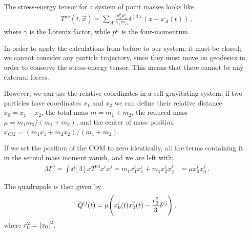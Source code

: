 \documentclass[main.tex]{subfiles}
\begin{document}
The stress-energy tensor for a system of point masses looks like 
%
\begin{align}
T^{\mu \nu }(t, \vec{x}) = \sum _{A} \frac{p^{\mu }_{A} p^{\nu }_{A}}{\gamma_{A}  m_{A}} \delta^{(3)} (x - x_{A}(t))
\,,
\end{align}
%
where \(\gamma \) is the Lorentz factor, while \(p^{\mu }\) is the four-momentum.  

In order to apply the calculations from before to our system, it must be closed; we cannot consider any particle trajectory, since they must move on geodesics in order to conserve the stress-energy tensor. This means that there cannot be any external forces. 

However, we can use the relative coordinates in a self-gravitating system: if two particles have coordinates \(x_1\) and \(x_2\) we can define their relative distance \(x_0 = x_1 - x_2 \), the total mass \(m = m_1 + m_2 \), the reduced mass \(\mu = m_1 m_2 / (m_1 + m_2 )\), and the center of mass position \(x _{\text{CM}} = (m_1 x_1 +m_2 x_2 ) / (m_1 + m_2 )\). 

If we set the position of the COM to zero identically, all the terms containing it in the second mass moment vanish, and we are left with;
%
\begin{align}
M^{ij} = \int \dd[3]{x} T^{00} x^{i}x^{j} = m_1 x^{i}_{1} x^{i}_{1}
+ m_2 x^{i}_{2} x^{j}_{2}
&= \mu x^{i}_{0} x^{j}_{0}
\,.
\end{align}

The quadrupole is then given by 
%
\begin{align}
Q^{ij} (t) = \mu \qty(x^{i}_{0} (t)x^{j}_{0} (t) - \frac{r_0^2}{3} \delta^{ij})
\,,
\end{align}
%
where \(r_0^2 = \abs{x_0 }^2\).
\end{document}
